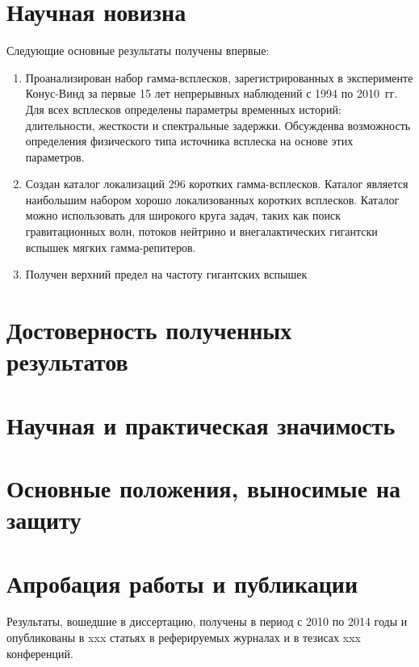 \section{Научная новизна}
Следующие основные результаты получены впервые:
\begin{enumerate}
\item Проанализирован набор гамма-всплесков, зарегистрированных в эксперименте 
Конус-Винд за первые 15 лет непрерывных наблюдений с 1994 по 2010~гг. Для всех 
всплесков определены параметры временных историй: длительности, жесткости и спектральные задержки.
Обсужденва возможность определения физического типа источника всплеска на основе этих параметров.

\item Создан каталог локализаций 296 коротких гамма-всплесков. Каталог является 
наибольшим набором хорошо локализованных коротких всплесков. Каталог можно использовать 
для широкого круга задач, таких как поиск гравитационных волн, потоков нейтрино 
и внегалактических гигантски вспышек мягких гамма-репитеров.

\item Получен верхний предел на частоту гигантских вспышек 

\end{enumerate}

\section{Достоверность полученных результатов}



\section{Научная и практическая значимость}



\section{Основные положения, выносимые на защиту}




\section{Апробация работы и публикации}
Результаты, вошедшие в диссертацию, получены в период с 2010 по 2014
годы и опубликованы в xxx статьях в реферируемых журналах и в тезисах xxx конференций. 

